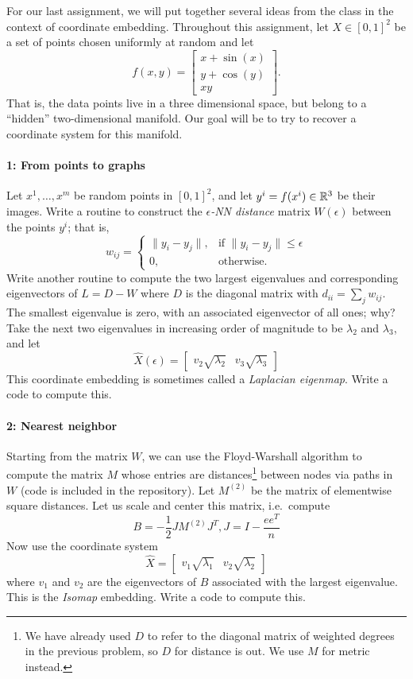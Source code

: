 \documentclass[12pt, leqno]{article} %
\begin{document}

For our last assignment, we will put together several ideas from the
class in the context of coordinate embedding.  Throughout this
assignment, let $X \in [0,1]^2$ be a set of points chosen uniformly at
random and let
\[
f(x,y) = \begin{bmatrix}
  x + \sin(x) \\
  y + \cos(y) \\
  xy
  \end{bmatrix}.
\]
That is, the data points live in a three dimensional space, but belong
to a ``hidden'' two-dimensional manifold.  Our goal will be to try to
recover a coordinate system for this manifold.

\paragraph*{1: From points to graphs}
Let $x^1, \ldots, x^m$ be random points in $[0,1]^2$, and let
$y^i = f(x^i) \in \mathbb{R}^3$ be their images.
Write a routine to construct the {\em $\epsilon$-NN distance} matrix
$W(\epsilon)$ between the points $y^i$; that is,
\[
  w_{ij} =
  \begin{cases}
    \|y_i-y_j\|, & \mbox{if } \|y_i-y_j\| \leq \epsilon \\
    0, & \mbox{otherwise}.
  \end{cases}
\]
Write another routine to compute the two largest eigenvalues and
corresponding eigenvectors of $L = D-W$ where $D$ is the diagonal
matrix with $d_{ii} = \sum_j w_{ij}$.  The smallest eigenvalue is
zero, with an associated eigenvector of all ones; why?  Take the
next two eigenvalues in increasing order of magnitude to be
$\lambda_2$ and $\lambda_3$, and let
\[
  \hat{X}(\epsilon) =
  \begin{bmatrix}
    v_2 \sqrt{\lambda_2} &
    v_3 \sqrt{\lambda_3}
  \end{bmatrix}
\]
This coordinate embedding is sometimes called a {\em Laplacian eigenmap}.
Write a code to compute this.

\paragraph*{2: Nearest neighbor}
Starting from the matrix $W$, we can use the Floyd-Warshall algorithm
to compute the matrix $M$ whose entries are distances\footnote{%
  We have already used $D$ to refer to the diagonal matrix of weighted
  degrees in the previous problem, so $D$ for distance is out.  We use
  $M$ for metric instead.
}
between nodes via paths in $W$ (code is included in the repository).
Let $M^{(2)}$ be the matrix of elementwise square distances.  Let us
scale and center this matrix, i.e.~compute
\[
  B = -\frac{1}{2} J M^{(2)} J^T, J = I-\frac{ee^T}{n}
\]
Now use the coordinate system
\[
  \hat{X} =
  \begin{bmatrix}
    v_1 \sqrt{\lambda_1} &
    v_2 \sqrt{\lambda_2}
  \end{bmatrix}
\]
where $v_1$ and $v_2$ are the eigenvectors of $B$ associated with the
largest eigenvalue.  This is the {\em Isomap} embedding.
Write a code to compute this.
\end{document}
